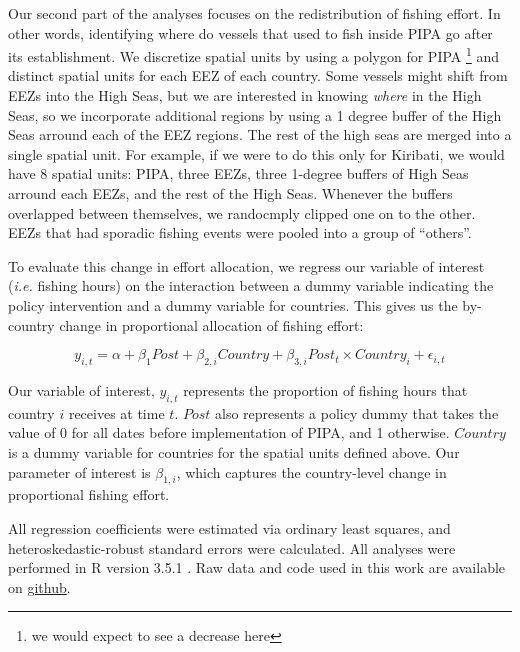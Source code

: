 \documentclass[11pt,]{article}
\let\rmarkdownfootnote\footnote%
\def\footnote{\protect\rmarkdownfootnote}
\begin{document}
Our second part of the analyses focuses on the redistribution of fishing
effort. In other words, identifying where do vessels that used to fish
inside PIPA go after its establishment. We discretize spatial units by
using a polygon for PIPA
\footnote{we would expect to see a decrease here} and distinct spatial
units for each EEZ of each country. Some vessels might shift from EEZs
into the High Seas, but we are interested in knowing \emph{where} in the
High Seas, so we incorporate additional regions by using a 1 degree
buffer of the High Seas arround each of the EEZ regions. The rest of the
high seas are merged into a single spatial unit. For example, if we were
to do this only for Kiribati, we would have 8 spatial units: PIPA, three
EEZs, three 1-degree buffers of High Seas arround each EEZs, and the
rest of the High Seas. Whenever the buffers overlapped between
themselves, we randocmply clipped one on to the other. EEZs that had
sporadic fishing events were pooled into a group of ``others''.

To evaluate this change in effort allocation, we regress our variable of
interest (\emph{i.e.} fishing hours) on the interaction between a dummy
variable indicating the policy intervention and a dummy variable for
countries. This gives us the by-country change in proportional
allocation of fishing effort:

\[
y_{i,t} = \alpha + \beta_1Post + \beta_{2,i}Country + \beta_{3,i}Post_t \times Country_i + \epsilon_{i,t}
\]

Our variable of interest, \(y_{i,t}\) represents the proportion of
fishing hours that country \(i\) receives at time \(t\). \(Post\) also
represents a policy dummy that takes the value of 0 for all dates before
implementation of PIPA, and 1 otherwise. \(Country\) is a dummy variable
for countries for the spatial units defined above. Our parameter of
interest is \(\beta_{1,i}\), which captures the country-level change in
proportional fishing effort.

All regression coefficients were estimated via ordinary least squares,
and heteroskedastic-robust standard errors were calculated. All analyses
were performed in R version 3.5.1 \citep{rcore_2018}. Raw data and code
used in this work are available on
\href{https://github.com/jcvdav/MPA_displacement}{github}.
\end{document}
